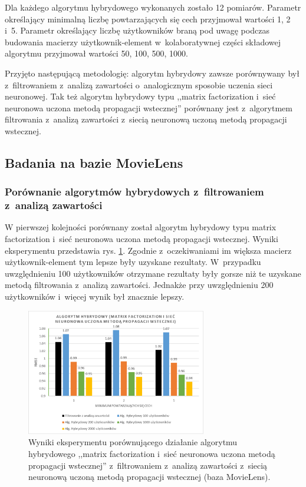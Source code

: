 \documentclass[twoside]{iisthesis}
\begin{document}
		Dla każdego algorytmu hybrydowego wykonanych zostało 12 pomiarów. Parametr określający minimalną liczbę powtarzających się cech przyjmował wartości 1, 2 i~5. Parametr określający liczbę użytkowników braną pod uwagę podczas budowania macierzy użytkownik-element w~kolaboratywnej części składowej algorytmu przyjmował wartości 50, 100, 500, 1000. 
		
		Przyjęto następującą metodologię: algorytm hybrydowy zawsze porównywany był z~filtrowaniem z~analizą zawartości o~analogicznym sposobie uczenia sieci neuronowej. Tak też algorytm hybrydowy typu ,,matrix factorization i~sieć neuronowa uczona metodą propagacji wstecznej'' porównany jest z~algorytmem filtrowania z~analizą zawartości z~siecią neuronową uczoną metodą propagacji wstecznej.
		
		\subsection{Badania na bazie MovieLens}
				
		\subsubsection{Porównanie algorytmów hybrydowych z~filtrowaniem z~analizą zawartości}
		
		W pierwszej kolejności porównany został algorytm hybrydowy typu matrix  factorization i~sieć neuronowa uczona metodą propagacji wstecznej. Wyniki eksperymentu przedstawia rys. \ref{fig:ml_exphybrid1_1}. Zgodnie z~oczekiwaniami im większa macierz użytkownik-element tym lepsze były uzyskane rezultaty. W~przypadku uwzględnieniu 100 użytkowników otrzymane rezultaty były gorsze niż te uzyskane metodą filtrowania z~analizą zawartości. Jednakże przy uwzględnieniu 200 użytkowników i~więcej wynik był znacznie lepszy. 
		
		\begin{figure}
			\centering
			\includegraphics[width=0.7\textwidth]{ml_exphybrid1_1}			
			\caption{Wyniki eksperymentu porównującego działanie algorytmu hybrydowego ,,matrix factorization i~sieć neuronowa uczona metodą propagacji wstecznej'' z~filtrowaniem z~analizą zawartości z~siecią neuronową uczoną metodą propagacji wstecznej (baza MovieLens).}
			\label{fig:ml_exphybrid1_1}
		\end{figure}
	
\end{document}
